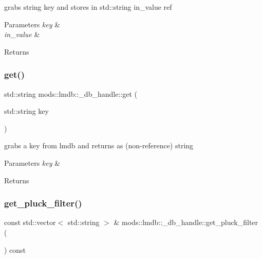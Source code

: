 grabs string key and stores in std\+::string in\+\_\+value ref 


\begin{DoxyParams}{Parameters}
{\em key} & \\
\hline
{\em in\+\_\+value} & \\
\hline
\end{DoxyParams}
\begin{DoxyReturn}{Returns}

\end{DoxyReturn}
\mbox{\label{structmods_1_1lmdb_1_1__db__handle_a55bcadafaf012aeb3dcef782eb0d782c}} 
\subsubsection{\texorpdfstring{get()}{get()}\hspace{0.1cm}{\footnotesize\ttfamily [2/2]}}
{\footnotesize\ttfamily std\+::string mods\+::lmdb\+::\+\_\+db\+\_\+handle\+::get (\begin{DoxyParamCaption}\item[{std\+::string}]{key }\end{DoxyParamCaption})}



grabs a key from lmdb and returns as (non-\/reference) string 


\begin{DoxyParams}{Parameters}
{\em key} & \\
\hline
\end{DoxyParams}
\begin{DoxyReturn}{Returns}

\end{DoxyReturn}
\mbox{\label{structmods_1_1lmdb_1_1__db__handle_ad5ac6cd8bed5f6330b1fecf8f9a55f8e}} 
\subsubsection{\texorpdfstring{get\+\_\+pluck\+\_\+filter()}{get\_pluck\_filter()}}
{\footnotesize\ttfamily const std\+::vector$<$ std\+::string $>$ \& mods\+::lmdb\+::\+\_\+db\+\_\+handle\+::get\+\_\+pluck\+\_\+filter (\begin{DoxyParamCaption}{ }\end{DoxyParamCaption}) const}



